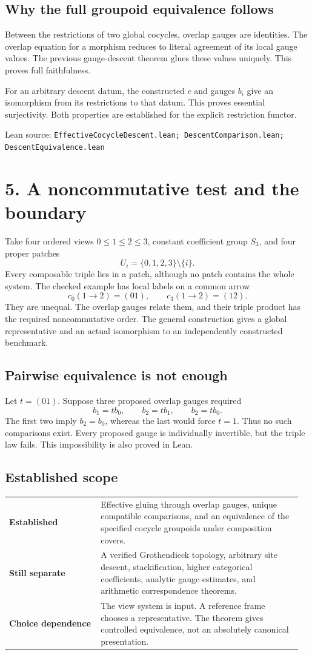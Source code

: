 \documentclass[11pt]{article}
\newcommand{\source}[1]{\par{\footnotesize\textsf{Lean source:} \texttt{#1}}\par}
\begin{document}
\subsection*{Why the full groupoid equivalence follows}
Between the restrictions of two global cocycles, overlap gauges are identities. The overlap equation for a morphism reduces to literal agreement of its local gauge values. The previous gauge-descent theorem glues these values uniquely. This proves full faithfulness.

For an arbitrary descent datum, the constructed $c$ and gauges $b_i$ give an isomorphism from its restrictions to that datum. This proves essential surjectivity. Both properties are established for the explicit restriction functor.
\source{EffectiveCocycleDescent.lean; DescentComparison.lean; DescentEquivalence.lean}

\clearpage
\section*{5. A noncommutative test and the boundary}
Take four ordered views $0\le1\le2\le3$, constant coefficient group $S_3$, and four proper patches
\[
U_i=\{0,1,2,3\}\setminus\{i\}.
\]
Every composable triple lies in a patch, although no patch contains the whole system. The checked example has local labels on a common arrow
\[
c_0(1\to2)=(01),\qquad c_3(1\to2)=(12).
\]
They are unequal. The overlap gauges relate them, and their triple product has the required noncommutative order. The general construction gives a global representative and an actual isomorphism to an independently constructed benchmark.

\subsection*{Pairwise equivalence is not enough}
Let $t=(01)$. Suppose three proposed overlap gauges required
\[
b_1=tb_0,\qquad b_2=tb_1,\qquad b_2=tb_0.
\]
The first two imply $b_2=b_0$, whereas the last would force $t=1$. Thus no such comparisons exist. Every proposed gauge is individually invertible, but the triple law fails. This impossibility is also proved in Lean.

\subsection*{Established scope}
\begin{tabular}{@{}p{0.30\linewidth}p{0.66\linewidth}@{}}
\toprule
\textbf{Established} & Effective gluing through overlap gauges, unique compatible comparisons, and an equivalence of the specified cocycle groupoids under composition covers.\\[5pt]
\textbf{Still separate} & A verified Grothendieck topology, arbitrary site descent, stackification, higher categorical coefficients, analytic gauge estimates, and arithmetic correspondence theorems.\\[5pt]
\textbf{Choice dependence} & The view system is input. A reference frame chooses a representative. The theorem gives controlled equivalence, not an absolutely canonical presentation.\\
\bottomrule
\end{tabular}
\end{document}
